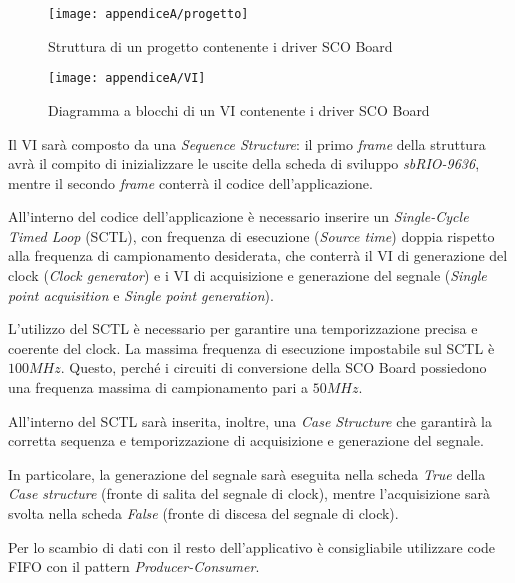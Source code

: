 \begin{figure}[H]
	\begin{center}
		\texttt{[image: appendiceA/progetto]}
		\caption{Struttura di un progetto contenente i driver SCO Board}
		\label{progetto}
	\end{center}
\end{figure}

\begin{figure}[H]
	\begin{center}
		\texttt{[image: appendiceA/VI]}
		\caption{Diagramma a blocchi di un VI contenente i driver SCO Board}
		\label{VI}
	\end{center}
\end{figure}

Il VI sarà composto da una \textit{Sequence Structure}: il primo \textit{frame} della struttura avrà il compito di inizializzare le uscite della scheda di sviluppo \textit{sbRIO-9636}, mentre il secondo \textit{frame} conterrà il codice dell'applicazione.

All'interno del codice dell'applicazione è necessario inserire un \textit{Single-Cycle Timed Loop} (SCTL), con frequenza di esecuzione (\textit{Source time}) doppia rispetto alla frequenza di campionamento desiderata, che conterrà il VI di generazione del clock (\textit{Clock generator}) e i VI di acquisizione e generazione del segnale (\textit{Single point acquisition} e \textit{Single point generation}). 

L'utilizzo del SCTL è necessario per garantire una temporizzazione precisa e coerente del clock. La massima frequenza di esecuzione impostabile sul SCTL è $100MHz$. Questo, perché i circuiti di conversione della SCO Board possiedono una frequenza massima di campionamento pari a $50MHz$.

All'interno del SCTL sarà inserita, inoltre, una \textit{Case Structure} che garantirà la corretta sequenza e temporizzazione di acquisizione e generazione del segnale. 

In particolare, la generazione del segnale sarà eseguita nella scheda \textit{True} della \textit{Case structure} (fronte di salita del segnale di clock), mentre l'acquisizione sarà svolta nella scheda \textit{False} (fronte di discesa del segnale di clock).

Per lo scambio di dati con il resto dell'applicativo è consigliabile utilizzare code FIFO con il pattern \textit{Producer-Consumer}.